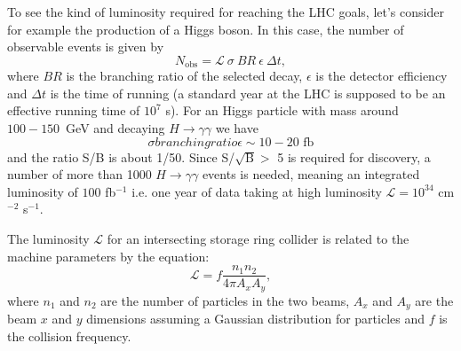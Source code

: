To see the kind of luminosity required for reaching the LHC goals, let's
consider for example the production of a Higgs boson.
In this case,  the number of observable events is given by
\begin{equation}\label{eq:NEvent}
N_{\mbox{obs}} = \mathcal L\ \sigma\ BR\ \epsilon\ \Delta t,
\end{equation}
where $BR$ is the branching ratio of the selected decay, $\epsilon$ is the detector efficiency and $\Delta t$ is the time of running (a standard year at the LHC is supposed to be an effective running time of $10^{7}$ s). For an Higgs particle with mass around $100 -150$~GeV and decaying $H \rightarrow \gamma\gamma$ we have \cite{slideGiacomo}
\begin{equation}\label{eq:higgs1}
\sigma branching ratio \epsilon \sim 10-20 \mbox{ fb}
\end{equation}
and the ratio S/B is about 1/50. Since S/$\sqrt{\mbox{B}} >$ 5 is required for discovery, a number of more than 1000 $H \rightarrow \gamma\gamma$ events is needed, meaning an integrated luminosity of $100$ fb$^{-1}$ i.e. one year of data taking at high luminosity $\mathcal L = 10^{34}$ cm$^{-2}$ s$^{-1}$.

The luminosity $\mathcal L$ for an intersecting storage ring collider 
is related to the machine parameters by the equation:
\begin{equation}\label{eq:lumi}
\mathcal L = f \dfrac{n_{1}n_{2}}{4\pi A_{x}A_{y}},
\end{equation}
where $n_{1}$ and $n_{2}$ are the number of particles in the two beams, $A_{x}$ and $A_{y}$ are the beam $x$ and $y$ dimensions assuming a Gaussian distribution for particles and $f$ is the collision frequency. 

